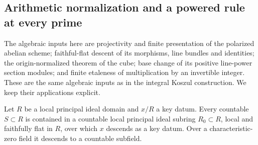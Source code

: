 \subsection{Arithmetic normalization and a powered rule at every prime}
\label{sec:ftb-powered-key-all-primes}

The algebraic inputs here are projectivity and finite presentation of
the polarized abelian scheme; faithful-flat descent of its morphisms,
line bundles and identities; the origin-normalized theorem of the cube;
base change of its positive line-power section modules; and finite
etaleness of multiplication by an invertible integer.  These are the
same algebraic inputs as in the integral Koszul construction.  We keep
their applications explicit.

\begin{srlemma}
\label{lem:ftb-key-countable-descent}
Let \(R\) be a local principal ideal domain and \(x/R\) a key datum.
Every countable \(S\subset R\) is contained in a countable local
principal ideal subring \(R_0\subset R\), local and faithfully flat
in \(R\), over which \(x\) descends as a key datum.
Over a characteristic-zero field it descends to a countable subfield.
\end{srlemma}
